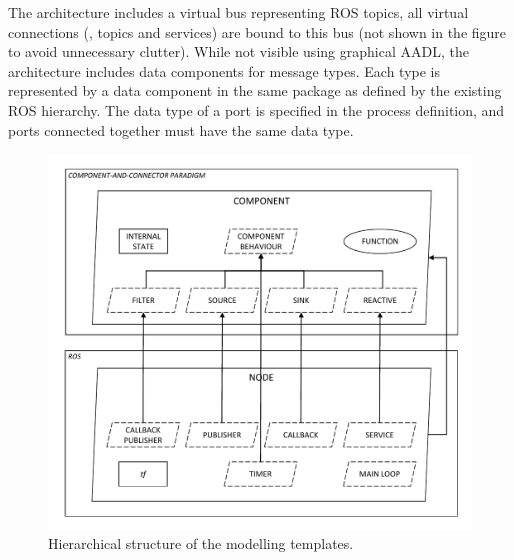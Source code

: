 The architecture includes a virtual bus representing ROS topics, all virtual connections (\ie, topics and services) are bound to this bus (not shown in the figure to avoid unnecessary clutter). While not visible using graphical AADL, the architecture includes data components for message types. Each type is represented by a data component in the same package as defined by the existing ROS hierarchy. The data type of a port is specified in the process definition, and ports connected together must have the same data type.

\begin{figure}[t]
    \centering
    \includegraphics[width=\textwidth]{gfx/hierarchy}
    \caption{Hierarchical structure of the modelling templates.}\label{fig:template}
\end{figure}

